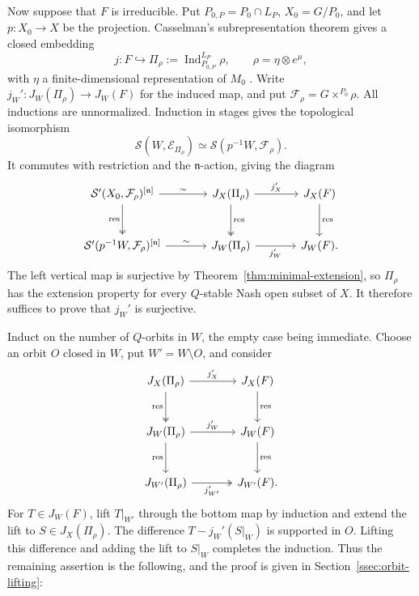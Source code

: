 \documentclass[a4paper,12pt]{amsart}
\numberwithin{equation}{section}
\theoremstyle{definition}
\theoremstyle{remark}
\newcommand{\fn}{\mathfrak n}
\newcommand{\mcS}{\mathcal S}
\newcommand{\mcE}{\mathcal E}
\begin{document}
Now suppose that $F$ is irreducible. Put $P_{0,P}=P_0\cap L_P$, $X_0=G/P_0$, and let $p:X_0\to X$ be the projection. Casselman's subrepresentation theorem gives a closed embedding
\[
 j:F\hookrightarrow\Pi_\rho:=\operatorname{Ind}_{P_{0,P}}^{L_P}\rho,
 \qquad \rho=\eta\otimes e^\mu,
\]
with $\eta$ a finite-dimensional representation of $M_0$ \cite[Corollary~5.7]{Cas89}. Write $j_W':J_W(\Pi_\rho)\to J_W(F)$ for the induced map, and put $\mathcal F_\rho=G\times^{P_0}\rho$. All inductions are unnormalized. Induction in stages gives the topological isomorphism
\begin{equation}\label{eq:open-induction-stages}
 \mcS(W,\mcE_{\Pi_\rho})\simeq\mcS(p^{-1}W,\mathcal F_\rho).
\end{equation}
It commutes with restriction and the $\fn$-action, giving the diagram
\begin{equation}\label{eq:principal-coefficient-extension}
\begin{tikzcd}[column sep=large,row sep=large]
 \mcS'(X_0,\mathcal F_\rho)^{[\fn]}\arrow[r,"\sim"]\arrow[d,two heads,"\mathrm{res}"']
 &J_X(\Pi_\rho)\arrow[r,"j_X'"]\arrow[d,two heads,"\mathrm{res}"]
 &J_X(F)\arrow[d,"\mathrm{res}"]\\
 \mcS'(p^{-1}W,\mathcal F_\rho)^{[\fn]}\arrow[r,"\sim"]
 &J_W(\Pi_\rho)\arrow[r,"j_W'"']&J_W(F).
\end{tikzcd}
\end{equation}
The left vertical map is surjective by Theorem~\ref{thm:minimal-extension}, so $\Pi_\rho$ has the extension property for every $Q$-stable Nash open subset of $X$. It therefore suffices to prove that $j_W'$ is surjective.

Induct on the number of $Q$-orbits in $W$, the empty case being immediate. Choose an orbit $O$ closed in $W$, put $W'=W\setminus O$, and consider
\[
\begin{tikzcd}[column sep=large,row sep=large]
 J_X(\Pi_\rho)\arrow[r,"j_X'"]\arrow[d,two heads,"\mathrm{res}"']
 &J_X(F)\arrow[d,"\mathrm{res}"]\\
 J_W(\Pi_\rho)\arrow[r,"j_W'"]\arrow[d,"\mathrm{res}"']
 &J_W(F)\arrow[d,"\mathrm{res}"]\\
 J_{W'}(\Pi_\rho)\arrow[r,two heads,"j_{W'}'"']&J_{W'}(F).
\end{tikzcd}
\]
For $T\in J_W(F)$, lift $T|_{W'}$ through the bottom map by induction and extend the lift to $S\in J_X(\Pi_\rho)$. The difference $T-j_W'(S|_W)$ is supported in $O$. Lifting this difference and adding the lift to $S|_W$ completes the induction. Thus the remaining assertion is the following, and the proof is given in Section~\ref{ssec:orbit-lifting}:
\end{document}
